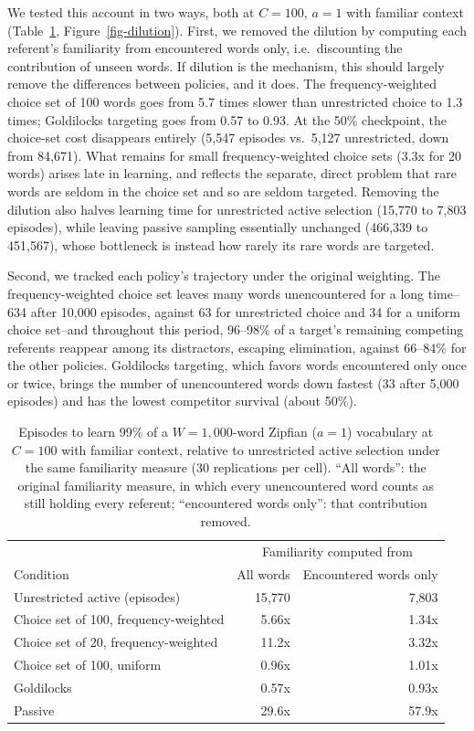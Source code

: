\documentclass[11pt]{article}
\begin{document}
We tested this account in two ways, both at $C=100$, $a=1$ with familiar context (Table~\ref{tab-dilution}, Figure~\ref{fig-dilution}). First, we removed the dilution by computing each referent's familiarity from encountered words only, i.e.\ discounting the contribution of unseen words. If dilution is the mechanism, this should largely remove the differences between policies, and it does. The frequency-weighted choice set of 100 words goes from 5.7 times slower than unrestricted choice to 1.3 times; Goldilocks targeting goes from 0.57 to 0.93. At the 50\% checkpoint, the choice-set cost disappears entirely (5,547 episodes vs.\ 5,127 unrestricted, down from 84,671). What remains for small frequency-weighted choice sets (3.3x for 20 words) arises late in learning, and reflects the separate, direct problem that rare words are seldom in the choice set and so are seldom targeted. Removing the dilution also halves learning time for unrestricted active selection (15,770 to 7,803 episodes), while leaving passive sampling essentially unchanged (466,339 to 451,567), whose bottleneck is instead how rarely its rare words are targeted.

Second, we tracked each policy's trajectory under the original weighting. The frequency-weighted choice set leaves many words unencountered for a long time--634 after 10,000 episodes, against 63 for unrestricted choice and 34 for a uniform choice set--and throughout this period, 96--98\% of a target's remaining competing referents reappear among its distractors, escaping elimination, against 66--84\% for the other policies. Goldilocks targeting, which favors words encountered only once or twice, brings the number of unencountered words down fastest (33 after 5,000 episodes) and has the lowest competitor survival (about 50\%).

\begin{table}[h]
\centering
\caption{\label{tab-dilution} Episodes to learn 99\% of a $W=1{,}000$-word Zipfian ($a=1$) vocabulary at $C=100$ with familiar context, relative to unrestricted active selection under the same familiarity measure (30 replications per cell). ``All words'': the original familiarity measure, in which every unencountered word counts as still holding every referent; ``encountered words only'': that contribution removed.}
\small
\begin{tabular}{lrr}
\hline
 & \multicolumn{2}{c}{Familiarity computed from} \\
Condition & All words & Encountered words only \\
\hline
Unrestricted active (episodes) & 15{,}770 & 7{,}803 \\
\hline
Choice set of 100, frequency-weighted & 5.66x & 1.34x \\
Choice set of 20, frequency-weighted & 11.2x & 3.32x \\
Choice set of 100, uniform & 0.96x & 1.01x \\
Goldilocks & 0.57x & 0.93x \\
Passive & 29.6x & 57.9x \\
\hline
\end{tabular}
\end{table}
\end{document}
